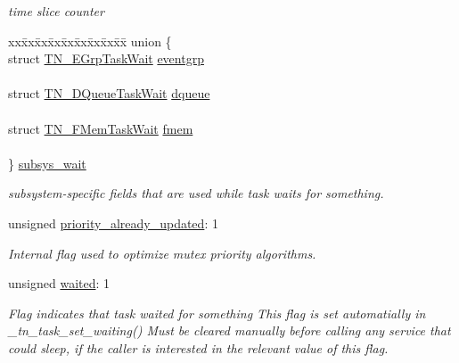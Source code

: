 \begin{DoxyCompactItemize}
\begin{DoxyCompactList}\small\item\em time slice counter \end{DoxyCompactList}\item 
\begin{tabbing}
xx\=xx\=xx\=xx\=xx\=xx\=xx\=xx\=xx\=\kill
union \{\\
\>struct \hyperlink{structTN__EGrpTaskWait}{TN\_EGrpTaskWait} \hyperlink{structTN__Task_a22c8cfe2e95d6f891aa568cafdb95936}{eventgrp}\\
\>\\
\>struct \hyperlink{structTN__DQueueTaskWait}{TN\_DQueueTaskWait} \hyperlink{structTN__Task_aa536e1eba96904c006d1e61efc520378}{dqueue}\\
\>\\
\>struct \hyperlink{structTN__FMemTaskWait}{TN\_FMemTaskWait} \hyperlink{structTN__Task_a31921e5384127319bffd5ae09debac1e}{fmem}\\
\>\\
\} \hyperlink{structTN__Task_a7b1e431e2e2c65d8de74d48b44cf68ee}{subsys\_wait}\\

\end{tabbing}\begin{DoxyCompactList}\small\item\em subsystem-\/specific fields that are used while task waits for something. \end{DoxyCompactList}\item 
unsigned \hyperlink{structTN__Task_abb4d22974c7317dd610f646b9048656d}{priority\+\_\+already\+\_\+updated}\+: 1
\begin{DoxyCompactList}\small\item\em Internal flag used to optimize mutex priority algorithms. \end{DoxyCompactList}\item 
unsigned \hyperlink{structTN__Task_a47c3a0a27be1ee526a1599a2ca8bb269}{waited}\+: 1
\begin{DoxyCompactList}\small\item\em Flag indicates that task waited for something This flag is set automatially in {\ttfamily \+\_\+tn\+\_\+task\+\_\+set\+\_\+waiting()} Must be cleared manually before calling any service that could sleep, if the caller is interested in the relevant value of this flag. \end{DoxyCompactList}\end{DoxyCompactItemize}


